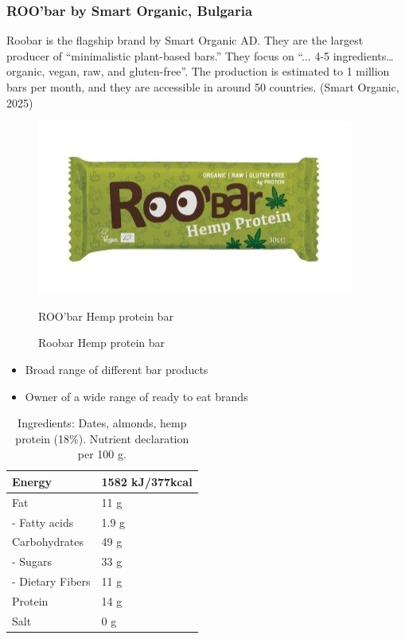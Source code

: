\subsubsection*{ROO'bar by Smart Organic, Bulgaria}
Roobar is the flagship brand by Smart Organic AD. They are the largest producer of “minimalistic plant-based bars.” They focus on “... 4-5 ingredients… organic, vegan, raw, and gluten-free”. The production is estimated to 1 million bars per month, and they are accessible in around 50 countries. (Smart Organic, 2025)
\begin{figure} 
    \centering
    \includegraphics[width=\linewidth]{Figures/fig_03.jpg}
    \caption{ROO'bar Hemp protein bar}
    \caption*{Roobar Hemp protein bar}
    \label{fig:introduction_03}
\end{figure}


\begin{itemize}
    \item Broad range of different bar products
    \item Owner of a wide range of ready to eat brands
\end{itemize}


\begin{table} 
    \centering
    \caption{Ingredients: Dates, almonds, hemp protein (18\%). Nutrient declaration per 100 g.}
    \label{tab:your_label}
    \begin{tabular}{|l|l|} 
        \hline
        Energy & 1582 kJ/377kcal \\ 
        \hline
        Fat & 11 g \\ 
        \hline
        - Fatty acids & 1.9 g \\ 
        \hline
        Carbohydrates & 49 g \\ 
        \hline
        - Sugars & 33 g \\ 
        \hline
        - Dietary Fibers & 11 g \\ 
        \hline
        Protein & 14 g \\ 
        \hline
        Salt & 0 g \\ 
        \hline
    \end{tabular}
\end{table}


